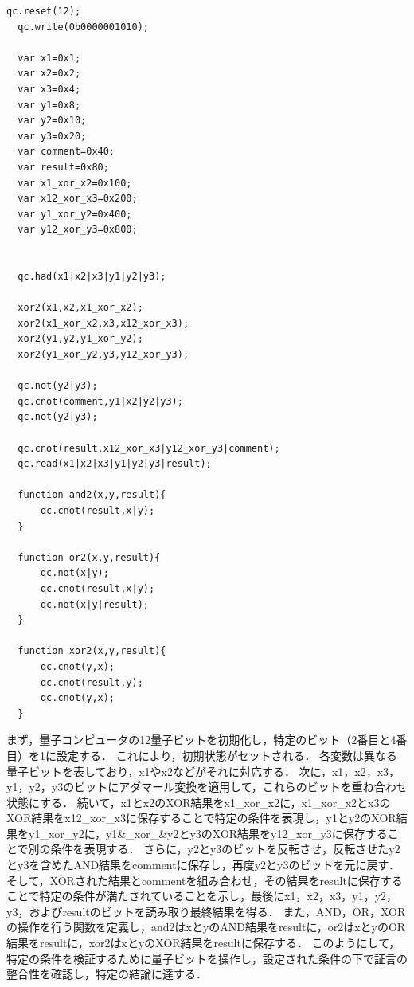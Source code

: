 \documentclass[titlepage,a4paper]{jsarticle}
\begin{document}
\begin{lstlisting}[caption=3人用QCEngin,label=3:ソースコード]
  qc.reset(12);         
  qc.write(0b0000001010);         
  
  var x1=0x1;
  var x2=0x2;
  var x3=0x4;
  var y1=0x8;
  var y2=0x10;
  var y3=0x20;
  var comment=0x40;
  var result=0x80;
  var x1_xor_x2=0x100;
  var x12_xor_x3=0x200;
  var y1_xor_y2=0x400;
  var y12_xor_y3=0x800;
  
  
  qc.had(x1|x2|x3|y1|y2|y3);
  
  xor2(x1,x2,x1_xor_x2);
  xor2(x1_xor_x2,x3,x12_xor_x3);
  xor2(y1,y2,y1_xor_y2);
  xor2(y1_xor_y2,y3,y12_xor_y3);
  
  qc.not(y2|y3);
  qc.cnot(comment,y1|x2|y2|y3);
  qc.not(y2|y3);
  
  qc.cnot(result,x12_xor_x3|y12_xor_y3|comment);
  qc.read(x1|x2|x3|y1|y2|y3|result);
  
  function and2(x,y,result){
      qc.cnot(result,x|y);
  }
  
  function or2(x,y,result){
      qc.not(x|y);
      qc.cnot(result,x|y);
      qc.not(x|y|result);
  }
  
  function xor2(x,y,result){
      qc.cnot(y,x);
      qc.cnot(result,y);
      qc.cnot(y,x);
  }
\end{lstlisting}
まず，量子コンピュータの12量子ビットを初期化し，特定のビット（2番目と4番目）を1に設定する．
これにより，初期状態がセットされる．
各変数は異なる量子ビットを表しており，x1やx2などがそれに対応する．
次に，x1，x2，x3，y1，y2，y3のビットにアダマール変換を適用して，これらのビットを重ね合わせ状態にする．
続いて，x1とx2のXOR結果をx1\_xor\_x2に，x1\_xor\_x2とx3のXOR結果をx12\_xor\_x3に保存することで特定の条件を表現し，y1とy2のXOR結果をy1\_xor\_y2に，y1\&\_xor\_\&y2とy3のXOR結果をy12\_xor\_y3に保存することで別の条件を表現する．
さらに，y2とy3のビットを反転させ，反転させたy2とy3を含めたAND結果をcommentに保存し，再度y2とy3のビットを元に戻す．
そして，XORされた結果とcommentを組み合わせ，その結果をresultに保存することで特定の条件が満たされていることを示し，最後にx1，x2，x3，y1，y2，y3，およびresultのビットを読み取り最終結果を得る．
また，AND，OR，XORの操作を行う関数を定義し，and2はxとyのAND結果をresultに，or2はxとyのOR結果をresultに，xor2はxとyのXOR結果をresultに保存する．
このようにして，特定の条件を検証するために量子ビットを操作し，設定された条件の下で証言の整合性を確認し，特定の結論に達する．
\end{document}

